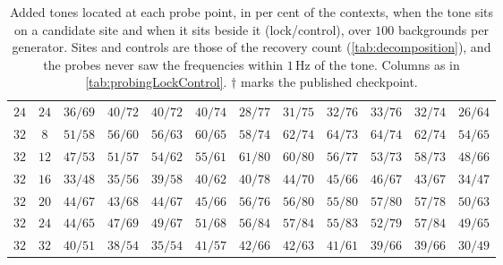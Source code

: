 \begin{table}[!tbp]
\begin{tabular}{@{}cccccccccccc@{}}
        $24$ & $24$ & $36/69$ & $40/72$ & $40/72$ & $40/74$ & $28/77$ & $31/75$ & $32/76$ & $33/76$ & $32/74$ & $26/64$ \\
        \addlinespace[2pt]
        $32$ & $8$ & $51/58$ & $56/60$ & $56/63$ & $60/65$ & $58/74$ & $62/74$ & $64/73$ & $64/74$ & $62/74$ & $54/65$ \\
        $32$ & $12$ & $47/53$ & $51/57$ & $54/62$ & $55/61$ & $61/80$ & $60/80$ & $56/77$ & $53/73$ & $58/73$ & $48/66$ \\
        $32$ & $16$ & $33/48$ & $35/56$ & $39/58$ & $40/62$ & $40/78$ & $44/70$ & $45/66$ & $46/67$ & $43/67$ & $34/47$ \\
        $32$ & $20$ & $44/67$ & $43/68$ & $44/67$ & $45/66$ & $56/76$ & $56/80$ & $55/80$ & $57/80$ & $57/78$ & $50/63$ \\
        $32$ & $24$ & $44/65$ & $47/69$ & $49/67$ & $51/68$ & $56/84$ & $57/84$ & $55/83$ & $52/79$ & $57/84$ & $49/65$ \\
        $32$ & $32$ & $40/51$ & $38/54$ & $35/54$ & $41/57$ & $42/66$ & $42/63$ & $41/61$ & $39/66$ & $39/66$ & $30/49$ \\
        \bottomrule
    \end{tabular}
    \caption{Added tones located at each probe point, in per cent of the contexts, when the tone sits on a candidate site and when it sits beside it (lock/control), over $100$ backgrounds per generator. Sites and controls are those of the recovery count (\autoref{tab:decomposition}), and the probes never saw the frequencies within $1$\,Hz of the tone. Columns as in \autoref{tab:probingLockControl}. $\dagger$ marks the published checkpoint.}
    \label{tab:probingLockControlBg}
\end{table}
